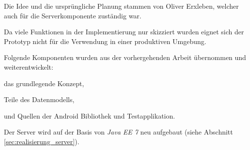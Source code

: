 Die Idee und die ursprüngliche Planung stammen von Oliver Erxleben, welcher auch für die Serverkomponente zuständig war.

Da viele Funktionen in der Implementierung nur skizziert wurden eignet sich der Prototyp nicht für die Verwendung in einer produktiven Umgebung.

Folgende Komponenten wurden aus der vorhergehenden Arbeit übernommen und weiterentwickelt:
\begin{compactitem}
	\item das grundlegende Konzept,
	\item Teile des Datenmodells,
	\item und Quellen der Android Bibliothek und Testapplikation.
\end{compactitem}

Der Server wird auf der Basis von \emph{Java EE 7} neu aufgebaut (siehe Abschnitt \ref{sec:realisierung_server}).